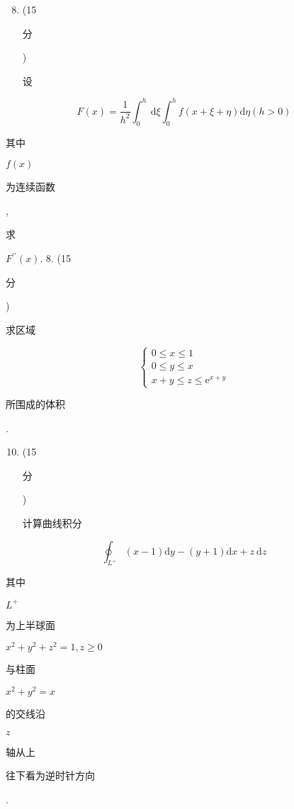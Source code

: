 \documentclass[10pt]{article}
\begin{document}
\begin{enumerate}
  \setcounter{enumi}{7}
  \item (15 \begin{CJK}{UTF8}{mj}分\end{CJK}) \begin{CJK}{UTF8}{mj}设\end{CJK}
\end{enumerate}
$$
F(x)=\frac{1}{h^{2}} \int_{0}^{h} \mathrm{~d} \xi \int_{0}^{h} f(x+\xi+\eta) \mathrm{d} \eta(h>0)
$$
\begin{CJK}{UTF8}{mj}其中\end{CJK} $f(x)$ \begin{CJK}{UTF8}{mj}为连续函数\end{CJK}, \begin{CJK}{UTF8}{mj}求\end{CJK} $F^{\prime \prime}(x)$. 8. (15 \begin{CJK}{UTF8}{mj}分\end{CJK}) \begin{CJK}{UTF8}{mj}求区域\end{CJK}
$$
\left\{\begin{array}{l}
0 \leq x \leq 1 \\
0 \leq y \leq x \\
x+y \leq z \leq \mathrm{e}^{x+y}
\end{array}\right.
$$
\begin{CJK}{UTF8}{mj}所围成的体积\end{CJK}.

\begin{enumerate}
  \setcounter{enumi}{9}
  \item (15 \begin{CJK}{UTF8}{mj}分\end{CJK}) \begin{CJK}{UTF8}{mj}计算曲线积分\end{CJK}
\end{enumerate}
$$
\oint_{L^{+}}(x-1) \mathrm{d} y-(y+1) \mathrm{d} x+z \mathrm{~d} z
$$
\begin{CJK}{UTF8}{mj}其中\end{CJK} $L^{+}$\begin{CJK}{UTF8}{mj}为上半球面\end{CJK} $x^{2}+y^{2}+z^{2}=1, z \geqslant 0$ \begin{CJK}{UTF8}{mj}与柱面\end{CJK} $x^{2}+y^{2}=x$ \begin{CJK}{UTF8}{mj}的交线沿\end{CJK} $z$ \begin{CJK}{UTF8}{mj}轴从上\end{CJK} \begin{CJK}{UTF8}{mj}往下看为逆时针方向\end{CJK}.
\end{document}
